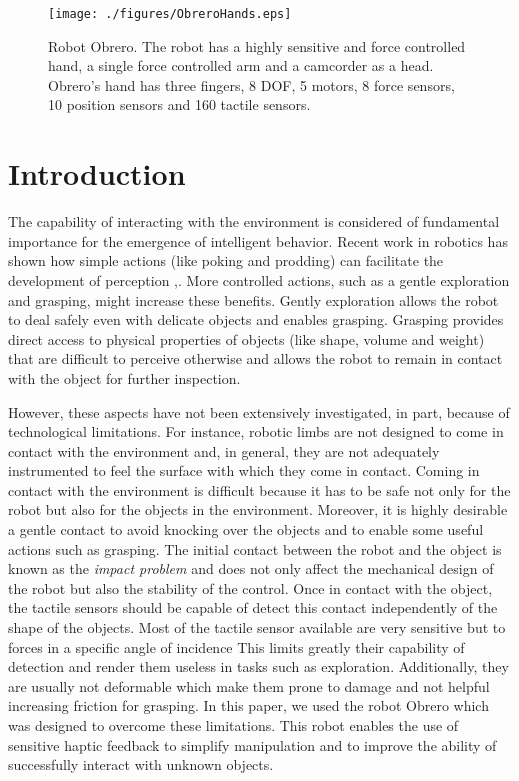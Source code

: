 \begin{figure}[tbp]
\centerline{
\texttt{[image: ./figures/ObreroHands.eps]}
} \caption{Robot Obrero. The robot has a highly sensitive and
force controlled hand, a single force controlled arm and a
camcorder as a head. Obrero's hand  has three fingers, 8 DOF, 5
motors, 8 force sensors, 10 position sensors and 160 tactile
sensors.} \label{fig:RobotObrero}
\end{figure}

\section{Introduction}

The capability of interacting with the environment is considered
of fundamental importance for the emergence of intelligent
behavior. Recent work in robotics has shown how simple actions
(like poking and prodding) can facilitate the development of
perception \cite{Natale05},\cite{metta03early}. More controlled
actions, such as a gentle exploration and grasping, might increase
these benefits. Gently exploration allows the robot to deal safely
even with delicate objects and enables grasping. Grasping provides
direct access to physical properties of objects (like shape,
volume and weight) that are difficult to perceive otherwise and
allows the robot to remain in contact with the object for further
inspection.

However, these aspects have not been extensively investigated, in
part, because of technological limitations. For instance, robotic
limbs are not designed to come in contact with the environment
and, in general, they are not adequately instrumented  to feel the
surface with which they come in contact. Coming in contact with
the environment is difficult because it has to be safe not only
for the robot but also for the objects in the environment.
Moreover, it is highly desirable a gentle contact to avoid
knocking over the objects and to enable some useful actions such
as grasping. The initial contact between the robot and the object
is known as the \emph{impact problem} and does not only affect the
mechanical design of the robot but also the stability of the
control\cite{volpe90real}. Once in contact with the object, the
tactile sensors should be capable of detect this contact
independently of the shape of the objects. Most of the tactile
sensor available are very sensitive but to forces in a specific
angle of incidence This limits greatly their capability of
detection and render them useless in tasks such as exploration.
Additionally, they are usually not deformable which make them
prone to damage and not helpful increasing friction for grasping.
In this paper, we used the robot Obrero\cite{obrero} which was
designed to overcome these limitations. This robot enables the use
of sensitive haptic feedback to simplify manipulation and to
improve the ability of successfully interact with unknown objects.

